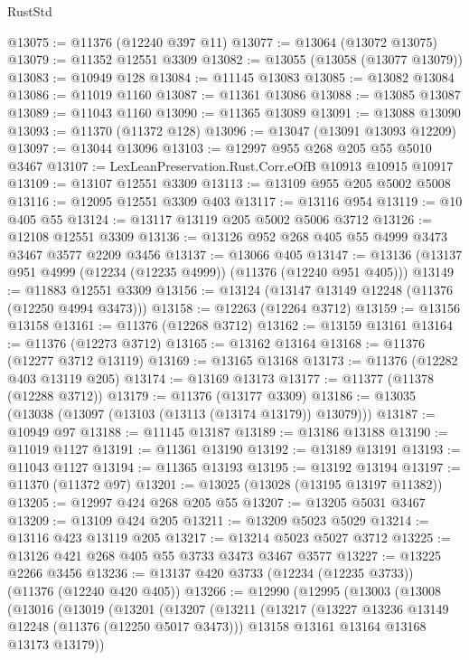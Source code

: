 \begin{lexlean}{RustStd}
\begin{coremodule}
{{{{{{{{{{{{{{{{{{{@13075 := @11376 (@12240 @397 @11)
@13077 := @13064 (@13072 @13075)
@13079 := @11352 @12551 @3309
@13082 := @13055 (@13058 (@13077 @13079))
@13083 := @10949 @128
@13084 := @11145 @13083
@13085 := @13082 @13084
@13086 := @11019 @1160
@13087 := @11361 @13086
@13088 := @13085 @13087
@13089 := @11043 @1160
@13090 := @11365 @13089
@13091 := @13088 @13090
@13093 := @11370 (@11372 @128)
@13096 := @13047 (@13091 @13093 @12209)
@13097 := @13044 @13096
@13103 := @12997 @955 @268 @205 @55 @5010 @3467
@13107 := LexLeanPreservation.Rust.Corr.eOfB @10913 @10915 @10917
@13109 := @13107 @12551 @3309
@13113 := @13109 @955 @205 @5002 @5008
@13116 := @12095 @12551 @3309 @403
@13117 := @13116 @954
@13119 := @10 @405 @55
@13124 := @13117 @13119 @205 @5002 @5006 @3712
@13126 := @12108 @12551 @3309
@13136 := @13126 @952 @268 @405 @55 @4999 @3473 @3467 @3577 @2209 @3456
@13137 := @13066 @405
@13147 := @13136 (@13137 @951 @4999 (@12234 (@12235 @4999)) (@11376 (@12240 @951 @405)))
@13149 := @11883 @12551 @3309
@13156 := @13124 (@13147 @13149 @12248 (@11376 (@12250 @4994 @3473)))
@13158 := @12263 (@12264 @3712)
@13159 := @13156 @13158
@13161 := @11376 (@12268 @3712)
@13162 := @13159 @13161
@13164 := @11376 (@12273 @3712)
@13165 := @13162 @13164
@13168 := @11376 (@12277 @3712 @13119)
@13169 := @13165 @13168
@13173 := @11376 (@12282 @403 @13119 @205)
@13174 := @13169 @13173
@13177 := @11377 (@11378 (@12288 @3712))
@13179 := @11376 (@13177 @3309)
@13186 := @13035 (@13038 (@13097 (@13103 (@13113 (@13174 @13179)) @13079)))
@13187 := @10949 @97
@13188 := @11145 @13187
@13189 := @13186 @13188
@13190 := @11019 @1127
@13191 := @11361 @13190
@13192 := @13189 @13191
@13193 := @11043 @1127
@13194 := @11365 @13193
@13195 := @13192 @13194
@13197 := @11370 (@11372 @97)
@13201 := @13025 (@13028 (@13195 @13197 @11382))
@13205 := @12997 @424 @268 @205 @55
@13207 := @13205 @5031 @3467
@13209 := @13109 @424 @205
@13211 := @13209 @5023 @5029
@13214 := @13116 @423 @13119 @205
@13217 := @13214 @5023 @5027 @3712
@13225 := @13126 @421 @268 @405 @55 @3733 @3473 @3467 @3577
@13227 := @13225 @2266 @3456
@13236 := @13137 @420 @3733 (@12234 (@12235 @3733)) (@11376 (@12240 @420 @405))
@13266 := @12990
    (@12995
      (@13003
        (@13008
          (@13016
            (@13019
              (@13201
                (@13207
                  (@13211
                    (@13217
                      (@13227 @13236 @13149 @12248 (@11376 (@12250 @5017 @3473)))
                      @13158
                      @13161
                      @13164
                      @13168
                      @13173
                      @13179))
}}}}}}}}}}}}}}}}}}}
\end{coremodule}
\end{lexlean}

